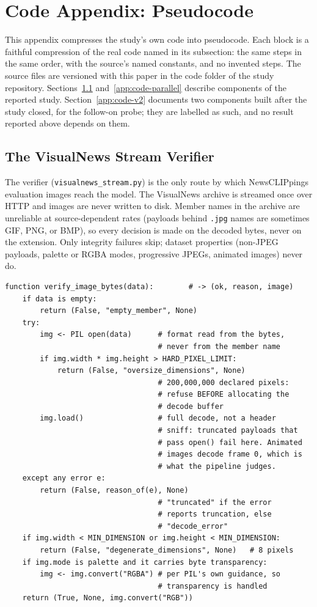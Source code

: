 \documentclass{article} %
\begin{document}
\section{Code Appendix: Pseudocode}
\label{app:code}
This appendix compresses the study's own code into pseudocode. Each block is a faithful compression of the real code named in its subsection: the same steps in the same order, with the source's named constants, and no invented steps. The source files are versioned with this paper in the code folder of the study repository. Sections~\ref{app:code-verifier} and~\ref{app:code-parallel} describe components of the reported study. Section~\ref{app:code-v2} documents two components built after the study closed, for the follow-on probe; they are labelled as such, and no result reported above depends on them.

\subsection{The VisualNews Stream Verifier}
\label{app:code-verifier}
The verifier (\texttt{visualnews\_stream.py}) is the only route by which NewsCLIPpings evaluation images reach the model. The VisualNews archive is streamed once over HTTP and images are never written to disk. Member names in the archive are unreliable at source-dependent rates (payloads behind \texttt{.jpg} names are sometimes GIF, PNG, or BMP), so every decision is made on the decoded bytes, never on the extension. Only integrity failures skip; dataset properties (non-JPEG payloads, palette or RGBA modes, progressive JPEGs, animated images) never do.

{\footnotesize\begin{verbatim}
function verify_image_bytes(data):        # -> (ok, reason, image)
    if data is empty:
        return (False, "empty_member", None)
    try:
        img <- PIL open(data)      # format read from the bytes,
                                   # never from the member name
        if img.width * img.height > HARD_PIXEL_LIMIT:
            return (False, "oversize_dimensions", None)
                                   # 200,000,000 declared pixels:
                                   # refuse BEFORE allocating the
                                   # decode buffer
        img.load()                 # full decode, not a header
                                   # sniff: truncated payloads that
                                   # pass open() fail here. Animated
                                   # images decode frame 0, which is
                                   # what the pipeline judges.
    except any error e:
        return (False, reason_of(e), None)
                                   # "truncated" if the error
                                   # reports truncation, else
                                   # "decode_error"
    if img.width < MIN_DIMENSION or img.height < MIN_DIMENSION:
        return (False, "degenerate_dimensions", None)   # 8 pixels
    if img.mode is palette and it carries byte transparency:
        img <- img.convert("RGBA") # per PIL's own guidance, so
                                   # transparency is handled
    return (True, None, img.convert("RGB"))
\end{verbatim}}
\end{document}
